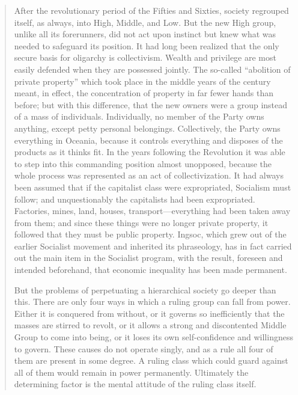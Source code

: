 \begin{quotation}
After the revolutionary period of the Fifties and Sixties, society
regrouped itself, as always, into High, Middle, and Low. But the new
High group, unlike all its forerunners, did not act upon instinct but
knew what was needed to safeguard its position. It had long been
realized that the only secure basis for oligarchy is collectivism.
Wealth and privilege are most easily defended when they are possessed
jointly. The so-called ``abolition of private property'' which took place
in the middle years of the century meant, in effect, the concentration
of property in far fewer hands than before; but with this difference,
that the new owners were a group instead of a mass of individuals.
Individually, no member of the Party owns anything, except petty
personal belongings. Collectively, the Party owns everything in Oceania,
because it controls everything and disposes of the products as it thinks
fit. In the years following the Revolution it was able to step into this
commanding position almost unopposed, because the whole process was
represented as an act of collectivization. It had always been assumed
that if the capitalist class were expropriated, Socialism must follow;
and unquestionably the capitalists had been expropriated. Factories,
mines, land, houses, transport---everything had been taken away from
them; and since these things were no longer private property, it
followed that they must be public property. Ingsoc, which grew out of
the earlier Socialist movement and inherited its phraseology, has in
fact carried out the main item in the Socialist program, with the
result, foreseen and intended beforehand, that economic inequality has
been made permanent.

But the problems of perpetuating a hierarchical society go deeper than
this. There are only four ways in which a ruling group can fall from
power. Either it is conquered from without, or it governs so
inefficiently that the masses are stirred to revolt, or it allows a
strong and discontented Middle Group to come into being, or it loses its
own self-confidence and willingness to govern. These causes do not
operate singly, and as a rule all four of them are present in some
degree. A ruling class which could guard against all of them would
remain in power permanently. Ultimately the determining factor is the
mental attitude of the ruling class itself.


\end{quotation}
